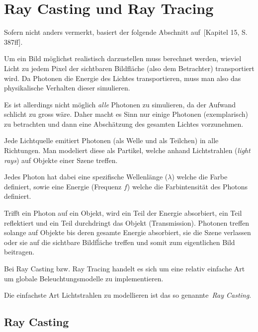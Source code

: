 \section{Ray Casting und Ray Tracing}
\label{sec:ray_casting_tracing}

Sofern nicht anders vermerkt, basiert der folgende Abschnitt
auf~\cite{hughes_computer_2013}[Kapitel 15, S. 387ff].

Um ein Bild möglichst realistisch darzustellen muss berechnet werden, wieviel
Licht zu jedem Pixel der sichtbaren Bildfläche (also dem Betrachter)
transportiert wird. Da Photonen die Energie des Lichtes transportieren, muss
man also das physikalische Verhalten dieser simulieren.

Es ist allerdings nicht möglich \textit{alle} Photonen zu simulieren, da
der Aufwand schlicht zu gross wäre. Daher macht es Sinn nur einige
Photonen (exemplarisch) zu betrachten und dann eine Abschätzung des
gesamten Lichtes vorzunehmen.

Jede Lichtquelle emitiert Photonen (als Welle und als Teilchen) in alle
Richtungen. Man modeliert diese als Partikel, welche anhand
Lichtstrahlen (\textit{light rays}) auf Objekte einer
Szene treffen.

Jedes Photon hat dabei eine spezifische Wellenlänge ($\lambda{}$) welche
die Farbe definiert, sowie eine Energie (Frequenz $f$) welche die
Farbintensität des Photons definiert.

Trifft ein Photon auf ein Objekt, wird ein Teil der Energie absorbiert,
ein Teil reflektiert und ein Teil durchdringt das Objekt (Transmission).
Photonen treffen solange auf Objekte bis deren gesamte Energie
absorbiert, sie die Szene verlassen oder sie auf die sichtbare
Bildfĺäche treffen und somit zum eigentlichen Bild beitragen.

Bei Ray Casting bzw. Ray Tracing handelt es sich um eine relativ
einfache Art um globale Beleuchtungsmodelle zu implementieren.

Die einfachste Art Lichtstrahlen zu modellieren ist das so
genannte~\textit{Ray Casting}.


\subsection{Ray Casting}
\label{subsec:ray_casting}


